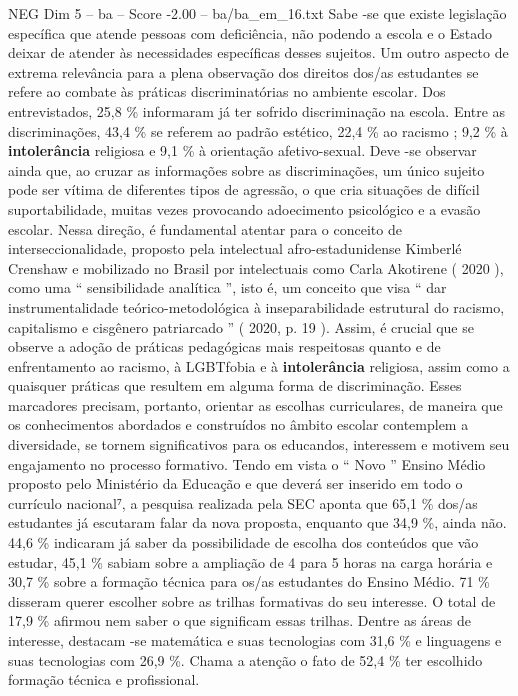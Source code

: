 \begin{textsample}{NEG Dim 5 – ba – Score -2.00 – ba/ba\_em\_16.txt}
Sabe -se que existe legislação específica que atende pessoas com deficiência, não podendo a escola e o Estado deixar de atender às necessidades específicas desses sujeitos.
Um outro aspecto de extrema relevância para a plena observação dos direitos dos/as estudantes se refere ao combate às práticas discriminatórias no ambiente escolar.
Dos entrevistados, 25,8 \% informaram já ter sofrido discriminação na escola.
Entre as discriminações, 43,4 \% se referem ao padrão estético, 22,4 \% ao racismo ; 9,2 \% à \textbf{intolerância} religiosa e 9,1 \% à orientação afetivo-sexual.
Deve -se observar ainda que, ao cruzar as informações sobre as discriminações, um único sujeito pode ser vítima de diferentes tipos de agressão, o que cria situações de difícil suportabilidade, muitas vezes provocando adoecimento psicológico e a evasão escolar.
Nessa direção, é fundamental atentar para o conceito de interseccionalidade, proposto pela intelectual afro-estadunidense Kimberlé Crenshaw e mobilizado no Brasil por intelectuais como Carla Akotirene ( 2020 ), como uma “ sensibilidade analítica ”, isto é, um conceito que visa “ dar instrumentalidade teórico-metodológica à inseparabilidade estrutural do racismo, capitalismo e cisgênero patriarcado ” ( 2020, p. 19 ).
Assim, é crucial que se observe a adoção de práticas pedagógicas mais respeitosas quanto e de enfrentamento ao racismo, à LGBTfobia e à \textbf{intolerância} religiosa, assim como a quaisquer práticas que resultem em alguma forma de discriminação.
Esses marcadores precisam, portanto, orientar as escolhas curriculares, de maneira que os conhecimentos abordados e construídos no âmbito escolar contemplem a diversidade, se tornem significativos para os educandos, interessem e motivem seu engajamento no processo formativo.
Tendo em vista o “ Novo ” Ensino Médio proposto pelo Ministério da Educação e que deverá ser inserido em todo o currículo nacional⁷, a pesquisa realizada pela SEC aponta que 65,1 \% dos/as estudantes já escutaram falar da nova proposta, enquanto que 34,9 \%, ainda não. 44,6 \% indicaram já saber da possibilidade de escolha dos conteúdos que vão estudar, 45,1 \% sabiam sobre a ampliação de 4 para 5 horas na carga horária e 30,7 \% sobre a formação técnica para os/as estudantes do Ensino Médio. 71 \% disseram querer escolher sobre as trilhas formativas do seu interesse.
O total de 17,9 \% afirmou nem saber o que significam essas trilhas.
Dentre as áreas de interesse, destacam -se matemática e suas tecnologias com 31,6 \% e linguagens e suas tecnologias com 26,9 \%.
Chama a atenção o fato de 52,4 \% ter escolhido formação técnica e profissional.

\end{textsample}
